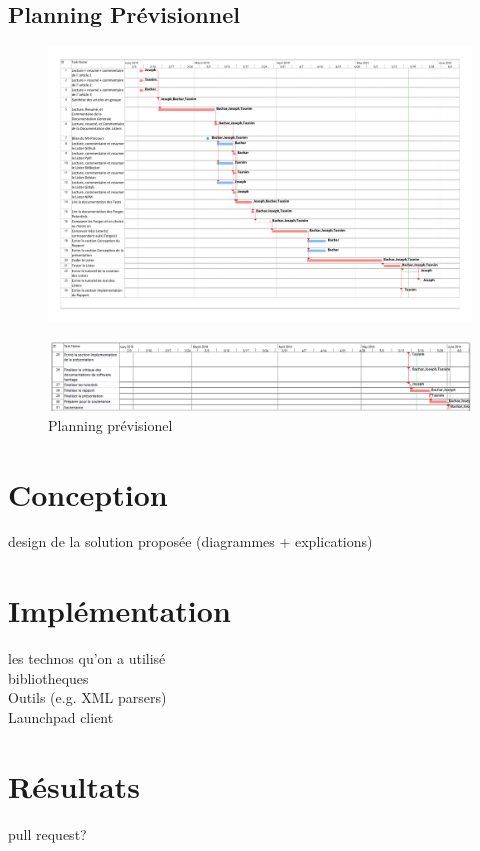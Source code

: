 \documentclass[12pt,a4paper]{report}
\theoremstyle{definition}
\begin{document}
\section{Planning Prévisionnel}
\begin{figure}[!ht]
\hspace*{-3.5cm}
\includegraphics[scale=0.48]{pdfs/feuille_de_route.pdf}
\end{figure}

\begin{figure}[!ht]
\hspace*{-3cm}
\includegraphics[scale=0.57]{images/planning_prev_p2.PNG}
\caption{Planning prévisionel}
\end{figure}

\chapter{Conception}
design de la solution proposée (diagrammes + explications)

\chapter{Implémentation}
les technos qu'on a utilisé\\
bibliotheques\\
Outils (e.g. XML parsers)\\
Launchpad client

\chapter{Résultats}
pull request?
\end{document}
